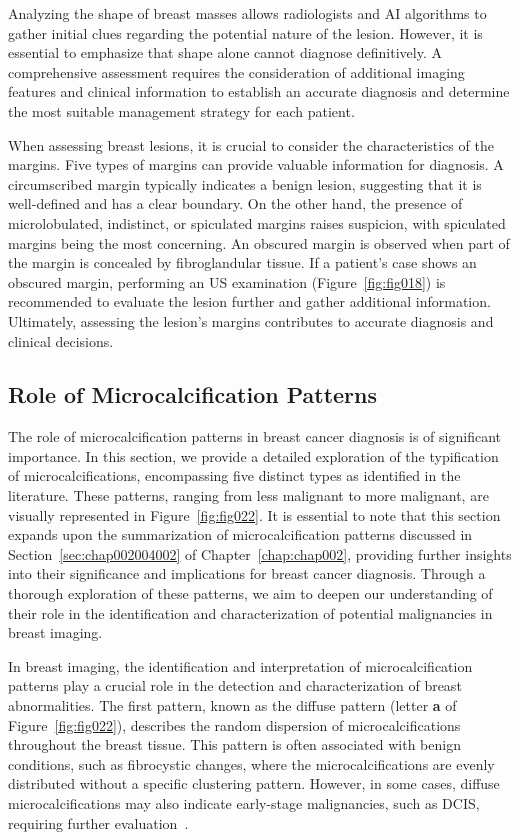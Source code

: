 Analyzing the shape of breast masses allows radiologists and \ac{AI} algorithms to gather initial clues regarding the potential nature of the lesion.
However, it is essential to emphasize that shape alone cannot diagnose definitively.
A comprehensive assessment requires the consideration of additional imaging features and clinical information to establish an accurate diagnosis and determine the most suitable management strategy for each patient.

When assessing breast lesions, it is crucial to consider the characteristics of the margins. Five types of margins can provide valuable information for diagnosis.
A circumscribed margin typically indicates a benign lesion, suggesting that it is well-defined and has a clear boundary.
On the other hand, the presence of microlobulated, indistinct, or spiculated margins raises suspicion, with spiculated margins being the most concerning.
An obscured margin is observed when part of the margin is concealed by fibroglandular tissue.
If a patient's case shows an obscured margin, performing an \ac{US} examination (Figure~\ref{fig:fig018}) is recommended to evaluate the lesion further and gather additional information.
Ultimately, assessing the lesion's margins contributes to accurate diagnosis and clinical decisions.

\subsection{Role of Microcalcification Patterns}
\label{sec:app001004002}

The role of microcalcification patterns in breast cancer diagnosis is of significant importance.
In this section, we provide a detailed exploration of the typification of microcalcifications, encompassing five distinct types as identified in the literature.
These patterns, ranging from less malignant to more malignant, are visually represented in Figure~\ref{fig:fig022}.
It is essential to note that this section expands upon the summarization of microcalcification patterns discussed in Section~\ref{sec:chap002004002} of Chapter~\ref{chap:chap002}, providing further insights into their significance and implications for breast cancer diagnosis.
Through a thorough exploration of these patterns, we aim to deepen our understanding of their role in the identification and characterization of potential malignancies in breast imaging.

In breast imaging, the identification and interpretation of microcalcification patterns play a crucial role in the detection and characterization of breast abnormalities.
The first pattern, known as the diffuse pattern (letter {\bf a} of Figure~\ref{fig:fig022}), describes the random dispersion of microcalcifications throughout the breast tissue.
This pattern is often associated with benign conditions, such as fibrocystic changes, where the microcalcifications are evenly distributed without a specific clustering pattern.
However, in some cases, diffuse microcalcifications may also indicate early-stage malignancies, such as \ac{DCIS}, requiring further evaluation~\cite{10.1093/jnci/djaa080}.

